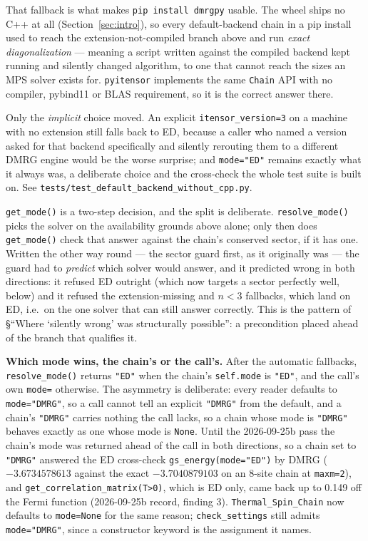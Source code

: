\documentclass[11pt]{article}
\begin{document}
That fallback is what makes \texttt{pip install dmrgpy} usable. The wheel
ships no C++ at all (Section~\ref{sec:intro}), so every default-backend
chain in a pip install used to reach the extension-not-compiled branch
above and run \emph{exact diagonalization} --- meaning a script written
against the compiled backend kept running and silently changed algorithm,
to one that cannot reach the sizes an MPS solver exists for.
\texttt{pyitensor} implements the same \texttt{Chain} API with no
compiler, pybind11 or BLAS requirement, so it is the correct answer there.

Only the \emph{implicit} choice moved. An explicit
\texttt{itensor\_version=3} on a machine with no extension still falls
back to ED, because a caller who named a version asked for that backend
specifically and silently rerouting them to a different DMRG engine would
be the worse surprise; and \texttt{mode="ED"} remains exactly what it
always was, a deliberate choice and the cross-check the whole test suite
is built on. See \texttt{tests/test\_default\_backend\_without\_cpp.py}.

\texttt{get\_mode()} is a two-step decision, and the split is deliberate.
\texttt{resolve\_mode()} picks the solver on the availability grounds
above alone; only then does \texttt{get\_mode()} check that answer
against the chain's conserved sector, if it has one. Written the other way
round --- the sector guard first, as it originally was --- the guard had
to \emph{predict} which solver would answer, and it predicted wrong in
both directions: it refused ED outright (which now targets a sector
perfectly well, below) and it refused the extension-missing and $n<3$
fallbacks, which land on ED, i.e.\ on the one solver that can still answer
correctly. This is the pattern of \S``Where `silently wrong' was
structurally possible'': a precondition placed ahead of the branch that
qualifies it.

\textbf{Which mode wins, the chain's or the call's.} After the automatic
fallbacks, \texttt{resolve\_mode()} returns \texttt{"ED"} when the chain's
\texttt{self.mode} is \texttt{"ED"}, and the call's own \texttt{mode=}
otherwise. The asymmetry is deliberate: every reader defaults to
\texttt{mode="DMRG"}, so a call cannot tell an explicit \texttt{"DMRG"}
from the default, and a chain's \texttt{"DMRG"} carries nothing the call
lacks, so a chain whose mode is \texttt{"DMRG"} behaves exactly as one
whose mode is \texttt{None}. Until the 2026-09-25b pass the chain's mode
was returned ahead of the call in both directions, so a chain set to
\texttt{"DMRG"} answered the ED cross-check \texttt{gs\_energy(mode="ED")}
by DMRG ($-3.6734578613$ against the exact $-3.7040879103$ on an 8-site
chain at \texttt{maxm=2}), and \texttt{get\_correlation\_matrix(T>0)},
which is ED only, came back up to 0.149 off the Fermi function
(2026-09-25b record, finding 3). \texttt{Thermal\_Spin\_Chain} now defaults
to \texttt{mode=None} for the same reason; \texttt{check\_settings} still
admits \texttt{mode="DMRG"}, since a constructor keyword is the assignment
it names.
\end{document}
